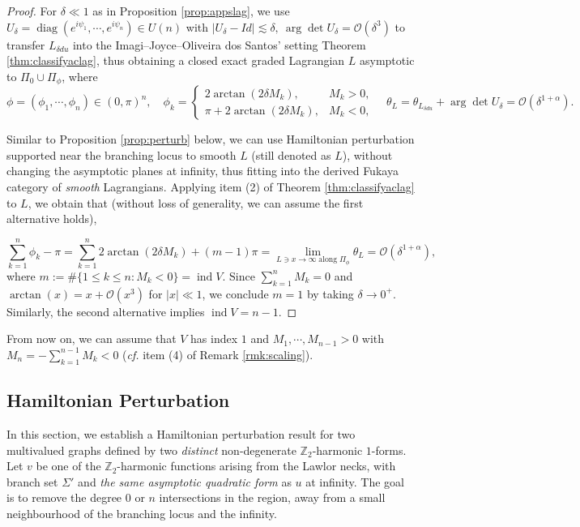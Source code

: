 \documentclass[11pt,a4paper]{article}
\numberwithin{equation}{section}%
\theoremstyle{definition}
\newcommand{\cf}{\emph{cf.} }
\newcommand{\Z}{\mathbb{Z}}
\begin{document}
\begin{proof}
    For $\delta \ll 1$ as in Proposition \ref{prop:appslag}, we use  $U_\delta=\operatorname{diag}(e^{i\psi_1},\cdots,e^{i\psi_n})\in U(n)$ with $|U_\delta-Id|\lesssim \delta,~ \arg \det U_\delta=\mathcal{O}(\delta^3)$ to transfer $L_{\delta du}$ into the Imagi--Joyce--Oliveira dos Santos' setting Theorem \ref{thm:classifyaclag}, thus obtaining a closed exact graded Lagrangian $L$ asymptotic to  $\Pi_0\cup\Pi_\phi$, where 
    $$\phi=(\phi_1,\cdots,\phi_n)\in (0,\pi)^n,\quad \phi_k=\left\{\begin{array}{ll}
         2\arctan (2\delta M_k),& M_k>0, \\
         \pi+2\arctan (2\delta M_k),&  M_k<0,
    \end{array}\right.\quad \theta_{L}=\theta_{L_{\delta du}}+\arg\det U_\delta =\mathcal{O}(\delta^{1+\alpha}).$$ 

    Similar to Proposition \ref{prop:perturb} below, we can use Hamiltonian perturbation supported near the branching locus to smooth $L$ (still denoted as $L$), without changing the asymptotic planes at infinity, thus fitting into the derived Fukaya category of \textit{smooth} Lagrangians. Applying item (2) of Theorem \ref{thm:classifyaclag} to $L$, we obtain that (without loss of generality, we can assume the first alternative holds), 
      
     $$\sum_{k=1}^{n}\phi_k-\pi=\sum\limits_{k=1}^n2\arctan (2\delta M_k)+(m-1)\pi=\lim_{L \ni x\to \infty \operatorname{along} \Pi_\phi}\theta_{L}=\mathcal{O}(\delta^{1+\alpha}),$$
     where $m:=\#\{1\leqslant k\leqslant n:M_k<0\}=\operatorname{ind}V$.
     Since $\sum\limits_{k=1}^nM_k=0$ and $\operatorname{arctan}(x)=x+\mathcal{O}(x^3)$ for $|x|\ll 1$, we conclude $m=1$ by taking $\delta\to 0^+$. Similarly, the second alternative implies $\operatorname{ind}V=n-1$. 
\end{proof}
From now on, we can assume that $V$ has index $1$ and $M_1,\cdots,M_{n-1}>0$ with $M_n=-\sum\limits_{k=1}^{n-1}M_k<0$ (\cf item (4) of Remark \ref{rmk:scaling}).  


\subsection{Hamiltonian Perturbation} 

In this section, we establish a Hamiltonian perturbation result for two multivalued graphs defined by two \textit{distinct} non-degenerate $\Z_2$-harmonic $1$-forms. Let $v$ be one of the $\Z_2$-harmonic functions arising from the Lawlor necks, with branch set $\Sigma'$ and \textit{the same asymptotic quadratic form} as $u$ at infinity. The goal is to remove the degree $0$ or $n$ intersections in the region, away from a small neighbourhood of the branching locus and the infinity.
\end{document}
